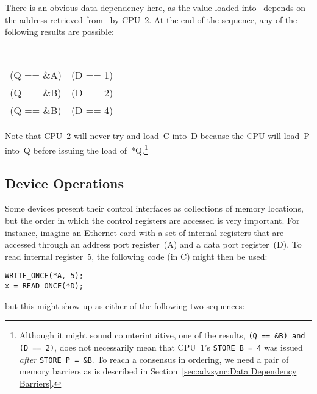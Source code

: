 There is an obvious data dependency here,
as the value loaded into~ depends on
the address retrieved from~ by CPU~2.
At the end of the sequence, any of the
following results are possible:

\vspace{5pt}
\begin{minipage}[t]{\columnwidth}
\tt
\scriptsize
\begin{tabular}{c@{ and }c}
	(Q == \&A) & (D == 1) \\
	(Q == \&B) & (D == 2) \\
	(Q == \&B) & (D == 4) \\
\end{tabular}
\end{minipage}
\vspace{5pt}

Note that CPU~2 will never try and load~C into~D because the CPU will load~P
into~Q before issuing the load of~*Q.\footnote{Although it might sound
	counterintuitive, one of the results,
	{\tt\scriptsize (Q~==~\&B) and (D~==~2)},
	does not necessarily mean that CPU~1's
	{\tt\scriptsize STORE B~=~4} was issued
	{\em after} {\tt\scriptsize STORE P~=~\&B}.
	To reach a consensus in ordering, we need a pair of memory barriers
	as is described in
	Section~\ref{sec:advsync:Data Dependency Barriers}.}

\subsection{Device Operations}
\label{sec:advsync:Device Operations}

Some devices present their control interfaces as collections of memory
locations, but the order in which the control registers are accessed is very
important.  For instance, imagine an Ethernet card with a set of internal
registers that are accessed through an address port register~(A) and a data
port register~(D).  To read internal register~5, the following code (in C)
might then be used:

\vspace{5pt}
\begin{minipage}[t]{\columnwidth}
\scriptsize
\begin{verbatim}
WRITE_ONCE(*A, 5);
x = READ_ONCE(*D);
\end{verbatim}
\vspace{1pt}
\end{minipage}
%
but this might show up as either of the following two sequences:

